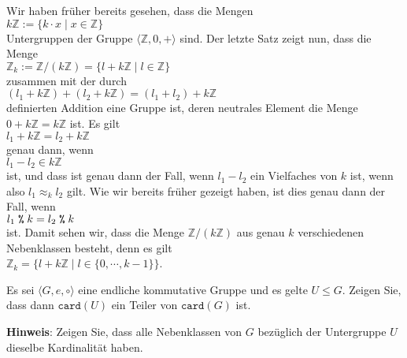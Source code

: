 \example
Wir haben früher bereits gesehen, dass die Mengen 
\\[0.2cm]
\hspace*{1.3cm}
$k\mathbb{Z} := \bigr\{ k \cdot x \mid x \in \mathbb{Z} \bigr\}$
\\[0.2cm]
Untergruppen der Gruppe $\langle \mathbb{Z}, 0, + \rangle$ sind.  Der letzte Satz zeigt nun, dass die Menge
\\[0.2cm]
\hspace*{1.3cm}
$\mathbb{Z}_k := \mathbb{Z}/(k\mathbb{Z}) = \bigl\{ l + k\mathbb{Z} \mid l \in \mathbb{Z} \}$
\\[0.2cm]
zusammen mit der durch
\\[0.2cm]
\hspace*{1.3cm}
$(l_1 + k\mathbb{Z}) + (l_2 + k\mathbb{Z}) = (l_1 + l_2) + k\mathbb{Z}$
\\[0.2cm]
definierten Addition eine Gruppe ist, deren neutrales Element die Menge $0 + k\mathbb{Z} = k\mathbb{Z}$ ist.
Es gilt
\\[0.2cm]
\hspace*{1.3cm}
$l_1 + k\mathbb{Z} = l_2 + k\mathbb{Z}$
\\[0.2cm]
genau dann, wenn
\\[0.2cm]
\hspace*{1.3cm}
$l_1 - l_2 \in k\mathbb{Z}$
\\[0.2cm]
ist, und dass ist genau dann der Fall, wenn $l_1 - l_2$ ein Vielfaches von $k$ ist, wenn also
$l_1 \approx_k l_2$ gilt.  Wie wir bereits früher gezeigt haben, ist dies genau dann der Fall, wenn
\\[0.2cm]
\hspace*{1.3cm}
$l_1 \;\texttt{\%}\; k = l_2 \;\texttt{\%}\; k$
\\[0.2cm]
ist.  Damit sehen wir, dass die Menge $\mathbb{Z}/(k\mathbb{Z})$ aus genau $k$ verschiedenen Nebenklassen besteht, denn
es gilt
\\[0.2cm]
\hspace*{1.3cm}
$\mathbb{Z}_k = \bigl\{ l + k\mathbb{Z} \mid l \in \{0, \cdots, k - 1\} \bigr\}$.
\vspace*{0.2cm}

\exercise
Es sei $\langle G, e, \circ \rangle$ eine endliche kommutative Gruppe und es gelte $U \leq G$.
Zeigen Sie, dass dann $\mathtt{card}(U)$ ein Teiler von $\mathtt{card}(G)$ ist. 
\vspace*{0.2cm}

\noindent
\textbf{Hinweis}: Zeigen Sie, dass alle Nebenklassen von $G$ bezüglich der Untergruppe $U$ dieselbe
Kardinalität haben.
\exend

